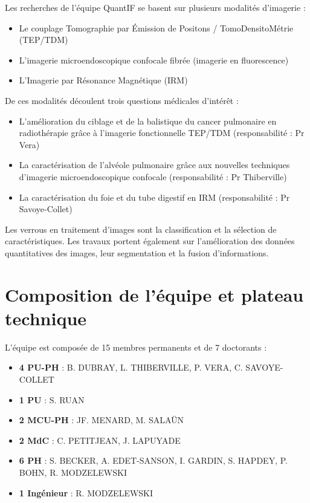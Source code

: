 \documentclass[12pt,a4paper]{report}
\begin{document}
Les recherches de l'équipe QuantIF se basent sur plusieurs modalités d'imagerie :

\begin{itemize}
\item Le couplage Tomographie par Émission de Positons / TomoDensitoMétrie (TEP/TDM)
\item L'imagerie microendoscopique confocale fibrée (imagerie en fluorescence)
\item L'Imagerie par Résonance Magnétique (IRM)
\end{itemize}

De ces modalités découlent trois questions médicales d'intérêt :

\begin{itemize}
\item L'amélioration du ciblage et de la balistique du cancer pulmonaire en radiothérapie grâce à l'imagerie fonctionnelle TEP/TDM (responsabilité : Pr Vera)
\item La caractérisation de l'alvéole pulmonaire grâce aux nouvelles techniques d'imagerie microendoscopique confocale (responsabilité : Pr Thiberville)
\item La caractérisation du foie et du tube digestif en IRM (responsabilité : Pr Savoye-Collet)
\end{itemize}

Les verrous en traitement d'images sont la classification et la sélection de caractéristiques. Les travaux portent également sur l'amélioration des données quantitatives des images, leur segmentation et la fusion d'informations.

\section{Composition de l'équipe et plateau technique}

L'équipe est composée de 15 membres permanents et de 7 doctorants :

\begin{itemize}
\item \textbf{4 PU-PH} : B. DUBRAY, L. THIBERVILLE, P. VERA, C. SAVOYE-COLLET
\item \textbf{1 PU} : S. RUAN
\item \textbf{2 MCU-PH} : JF. MENARD, M. SALAÜN
\item \textbf{2 MdC} : C. PETITJEAN, J. LAPUYADE
\item \textbf{6 PH} : S. BECKER, A. EDET-SANSON, I. GARDIN, S. HAPDEY, P. BOHN, R. MODZELEWSKI
\item \textbf{1 Ingénieur} : R. MODZELEWSKI
\end{itemize}
\end{document}
